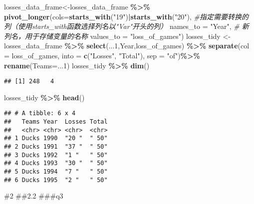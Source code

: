 \documentclass[
]{article}
\newenvironment{Shaded}{\begin{snugshade}}{\end{snugshade}}
\newcommand{\AttributeTok}[1]{\textcolor[rgb]{0.13,0.29,0.53}{#1}}
\newcommand{\CommentTok}[1]{\textcolor[rgb]{0.56,0.35,0.01}{\textit{#1}}}
\newcommand{\DecValTok}[1]{\textcolor[rgb]{0.00,0.00,0.81}{#1}}
\newcommand{\FunctionTok}[1]{\textcolor[rgb]{0.13,0.29,0.53}{\textbf{#1}}}
\newcommand{\NormalTok}[1]{#1}
\newcommand{\OtherTok}[1]{\textcolor[rgb]{0.56,0.35,0.01}{#1}}
\newcommand{\SpecialCharTok}[1]{\textcolor[rgb]{0.81,0.36,0.00}{\textbf{#1}}}
\newcommand{\StringTok}[1]{\textcolor[rgb]{0.31,0.60,0.02}{#1}}
\begin{document}
\begin{Shaded}
\begin{Highlighting}[]
\NormalTok{losses\_data\_frame}\OtherTok{\textless{}{-}}\NormalTok{losses\_data\_frame }\SpecialCharTok{\%\textgreater{}\%}
  \FunctionTok{pivot\_longer}\NormalTok{(}\AttributeTok{cols=}\FunctionTok{starts\_with}\NormalTok{(}\StringTok{"19"}\NormalTok{)}\SpecialCharTok{|}\FunctionTok{starts\_with}\NormalTok{(}\StringTok{"20"}\NormalTok{),   }\CommentTok{\#指定需要转换的列（使用starts\_with函数选择列名以"Var"开头的列）}
               \AttributeTok{names\_to =} \StringTok{"Year"}\NormalTok{,        }\CommentTok{\# 新列名，用于存储变量的名称}
               \AttributeTok{values\_to =} \StringTok{"loss\_of\_games"}\NormalTok{)}
\NormalTok{losses\_tidy }\OtherTok{\textless{}{-}}\NormalTok{ losses\_data\_frame }\SpecialCharTok{\%\textgreater{}\%}
  \FunctionTok{select}\NormalTok{(...}\DecValTok{1}\NormalTok{,Year,loss\_of\_games) }\SpecialCharTok{\%\textgreater{}\%}
  \FunctionTok{separate}\NormalTok{(}\AttributeTok{col =}\NormalTok{ loss\_of\_games, }\AttributeTok{into =} \FunctionTok{c}\NormalTok{(}\StringTok{"Losses"}\NormalTok{, }\StringTok{"Total"}\NormalTok{), }\AttributeTok{sep =} \StringTok{"of"}\NormalTok{)}\SpecialCharTok{\%\textgreater{}\%}
  \FunctionTok{rename}\NormalTok{(}\AttributeTok{Teams=}\NormalTok{...}\DecValTok{1}\NormalTok{)}
\NormalTok{losses\_tidy }\SpecialCharTok{\%\textgreater{}\%} \FunctionTok{dim}\NormalTok{()}
\end{Highlighting}
\end{Shaded}

\begin{verbatim}
## [1] 248   4
\end{verbatim}

\begin{Shaded}
\begin{Highlighting}[]
\NormalTok{losses\_tidy }\SpecialCharTok{\%\textgreater{}\%} \FunctionTok{head}\NormalTok{()}
\end{Highlighting}
\end{Shaded}

\begin{verbatim}
## # A tibble: 6 x 4
##   Teams Year  Losses Total
##   <chr> <chr> <chr>  <chr>
## 1 Ducks 1990  "20 "  " 50"
## 2 Ducks 1991  "37 "  " 50"
## 3 Ducks 1992  "1 "   " 50"
## 4 Ducks 1993  "30 "  " 50"
## 5 Ducks 1994  "7 "   " 50"
## 6 Ducks 1995  "2 "   " 50"
\end{verbatim}

\#2 \#\#2.2 \#\#\#q3
\end{document}
